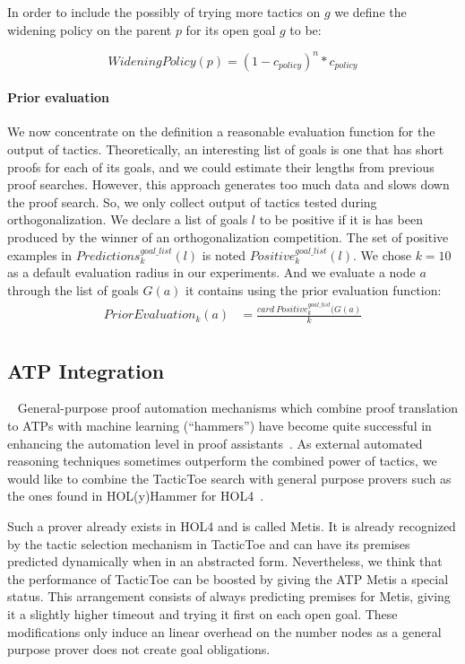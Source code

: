 \documentclass[runningheads,a4paper,draft]{svjour3}
\def\holfour{\textsf{HOL4}\xspace}
\def\holyhammer{\textsf{HOL(y)Hammer}\xspace}
\def\metis{\textsf{Metis}\xspace}
\def\tactictoe{\textsf{TacticToe}\xspace}
\begin{document}
In order to include the possibly of trying more tactics on $g$ we define the
widening policy on the parent $p$ for its open goal $g$ to be:

\[WideningPolicy(p) = (1 - c_{policy})^{n} * c_{policy}\]


\paragraph{Prior evaluation}\label{sec:evaluation}

We now concentrate on the definition a reasonable evaluation function for the
output of tactics. Theoretically, an interesting list of goals is one
that has short proofs for each of its goals, and we could estimate their
lengths from previous proof searches. However, this
approach generates too much data and slows down the proof search. So, we only
collect output of tactics tested during orthogonalization. We
declare a list of goals $l$ to be positive if it is has been produced by the
winner of an orthogonalization competition.
The set of positive examples in
$\mathit{Predictions}^{\mathit{goal\_list}}_k(l)$ is noted
$\mathit{Positive}^{\mathit{goal\_list}}_k(l)$.
We chose $k=10$ as a default evaluation radius in our experiments.
And we evaluate a node $a$ through the list of goals $G(a)$ it
contains using the prior evaluation function:
\begin{align*}
\mathit{PriorEvaluation}_k (a) &=
  \frac{card\ \mathit{Positive}^{\mathit{goal\_list}}_k(G(a)}{k}\\
\end{align*}


\subsection{ATP Integration}~\label{sec:atp}
General-purpose proof automation mechanisms which combine proof translation to
ATPs with machine learning (``hammers'') have become quite successful in
enhancing the automation level in proof assistants~\cite{hammers4qed}.
As external automated reasoning techniques sometimes outperform the combined
power of tactics, we would like to combine the \tactictoe search with
general purpose provers such as the ones found in \holyhammer for
\holfour~\cite{tgck-cpp15}.

Such a prover already exists in \holfour and is called \metis. It is already
recognized by the tactic selection mechanism in \tactictoe and can have its
premises predicted dynamically when in an abstracted form. Nevertheless,
we think that the performance of \tactictoe can be boosted by giving the ATP
\metis a special status. This arrangement consists of always predicting
premises for \metis, giving it a slightly higher timeout and
trying it first on each open goal. These modifications only induce an
linear overhead on the number nodes as a general purpose prover does not create
goal obligations.
\end{document}
